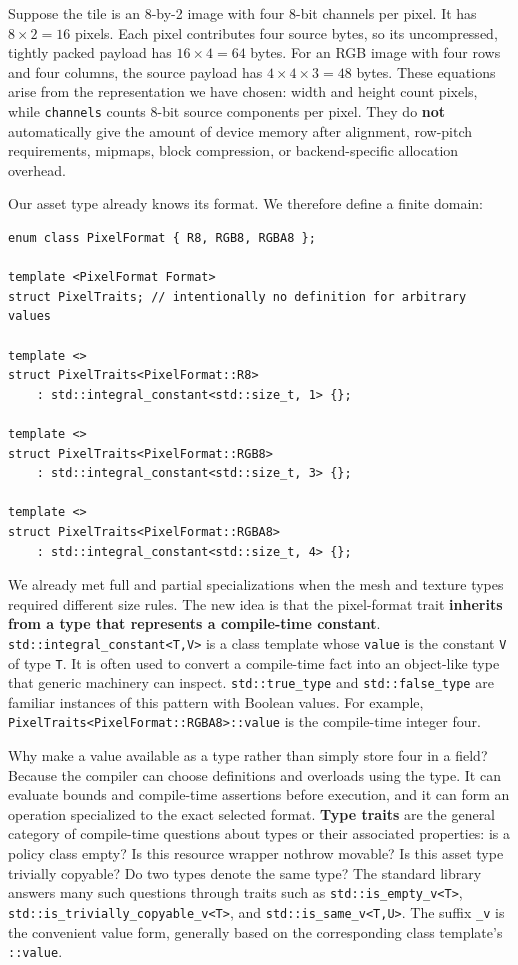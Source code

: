 Suppose the tile is an 8-by-2 image with four 8-bit channels per pixel. It has \(8\times 2=16\) pixels. Each pixel contributes four source bytes, so its uncompressed, tightly packed payload has \(16\times4=64\) bytes. For an RGB image with four rows and four columns, the source payload has \(4\times4\times3=48\) bytes. These equations arise from the representation we have chosen: width and height count pixels, while \texttt{channels} counts 8-bit source components per pixel. They do \textbf{not} automatically give the amount of device memory after alignment, row-pitch requirements, mipmaps, block compression, or backend-specific allocation overhead.

Our asset type already knows its format. We therefore define a finite domain:

\begin{verbatim}
enum class PixelFormat { R8, RGB8, RGBA8 };

template <PixelFormat Format>
struct PixelTraits; // intentionally no definition for arbitrary values

template <>
struct PixelTraits<PixelFormat::R8>
    : std::integral_constant<std::size_t, 1> {};

template <>
struct PixelTraits<PixelFormat::RGB8>
    : std::integral_constant<std::size_t, 3> {};

template <>
struct PixelTraits<PixelFormat::RGBA8>
    : std::integral_constant<std::size_t, 4> {};
\end{verbatim}

We already met full and partial specializations when the mesh and texture types required different size rules. The new idea is that the pixel-format trait \textbf{inherits from a type that represents a compile-time constant}. \texttt{std::integral\_constant\textless{}T,V\textgreater{}} is a class template whose \texttt{value} is the constant \texttt{V} of type \texttt{T}. It is often used to convert a compile-time fact into an object-like type that generic machinery can inspect. \texttt{std::true\_type} and \texttt{std::false\_type} are familiar instances of this pattern with Boolean values. For example, \texttt{PixelTraits\textless{}PixelFormat::RGBA8\textgreater{}::value} is the compile-time integer four.

Why make a value available as a type rather than simply store four in a field? Because the compiler can choose definitions and overloads using the type. It can evaluate bounds and compile-time assertions before execution, and it can form an operation specialized to the exact selected format. \textbf{Type traits} are the general category of compile-time questions about types or their associated properties: is a policy class empty? Is this resource wrapper nothrow movable? Is this asset type trivially copyable? Do two types denote the same type? The standard library answers many such questions through traits such as \texttt{std::is\_empty\_v\textless{}T\textgreater{}}, \texttt{std::is\_trivially\_copyable\_v\textless{}T\textgreater{}}, and \texttt{std::is\_same\_v\textless{}T,U\textgreater{}}. The suffix \texttt{\_v} is the convenient value form, generally based on the corresponding class template's \texttt{::value}.

